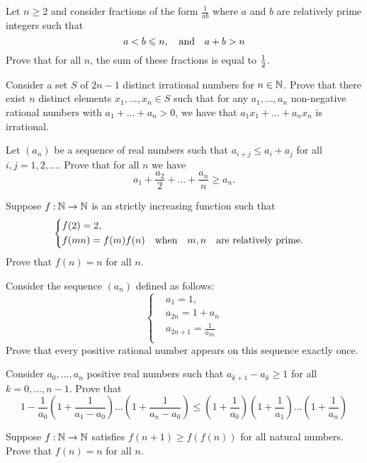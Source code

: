 \documentclass[12pt]{memoir}
\begin{document}
\begin{Ej}
    Let $n\geq 2$ and consider fractions of the form $\frac{1}{ab}$ where $a$ and $b$ are relatively prime integers such that 
    $$a<b\leqslant n,\quad\text{and}\quad a+b>n$$
    Prove that for all $n$, the sum of these fractions is equal to $\half$.
\end{Ej}

\begin{Ej}
    Consider a set $S$ of $2n-1$ distinct irrational numbers for $n\in\mathbb{N}$. Prove that there exist $n$ distinct elements $x_1,\dots,x_n\in S$ such that for any $a_1,\dots,a_n$ non-negative rational numbers with $a_1+\dots+a_n>0$, we have that $a_1x_1+\dots+a_nx_n$ is irrational.
\end{Ej}

\begin{Ej}
    Let $(a_n)$ be a sequence of real numbers such that $a_{i+j}\leq a_i+a_j$ for all $i,j=1,2,\dots$. Prove that for all $n$ we have 
    $$a_1+\frac{a_2}{2}+\dots+\frac{a_n}{n}\geq a_n.$$
\end{Ej}

\begin{Ej}
    Suppose $f\mathbin{:}\mathbb{N}\to\mathbb{N}$ is an strictly increasing function such that 
    $$
    \left\lbrace
    \begin{aligned}
        &f(2)=2,\\
        &f(mn)=f(m)f(n)\quad\text{when}\quad m,n\quad\text{are relatively prime.}\quad
    \end{aligned}
    \right.
    $$
    Prove that $f(n)=n$ for all $n$.
\end{Ej}

\begin{Ej}
    Consider the sequence $(a_n)$ defined as follows:
    $$
    \left\lbrace
    \begin{aligned}
        &a_1=1,\\
        &a_{2n}=1+a_n\\
        &a_{2n+1}=\frac{1}{a_{2n}}\\
    \end{aligned}
    \right.
    $$
    Prove that every positive rational number appears on this sequence exactly once.
\end{Ej}

\begin{Ej}
    Consider $a_0,\dots,a_n$ positive real numbers such that $a_{k+1}-a_k\geq 1$ for all $k=0,\dots,n-1$. Prove that 
    $$1-\frac{1}{a_0}\left(1+\frac{1}{a_1-a_0}\right)\dots\left(1+\frac{1}{a_n-a_0}\right)\leq\left(1+\frac{1}{a_0}\right)\left(1+\frac{1}{a_1}\right)\dots \left(1+\frac{1}{a_n}\right)$$
\end{Ej}

\begin{Ej}[IMO77]%
    Suppose $f\mathbin{:}\mathbb{N}\to\mathbb{N}$ satisfies $f(n+1)\geq f(f(n))$ for all natural numbers. Prove that $f(n)=n$ for all $n$.
\end{Ej}
\end{document}
